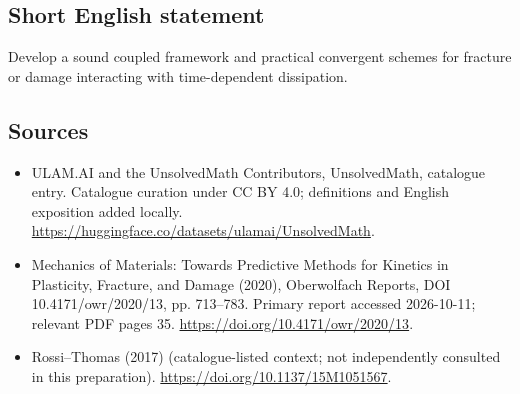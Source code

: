 \documentclass[11pt]{article}
\begin{document}
\subsection{Short English statement}
Develop a sound coupled framework and practical convergent schemes for fracture or damage interacting with time-dependent dissipation.
\subsection{Sources}
\begin{itemize}
\item[\hypertarget{source:statement:1}{S1}] ULAM.AI and the UnsolvedMath Contributors, UnsolvedMath, catalogue entry. Catalogue curation under CC BY 4.0; definitions and English exposition added locally.
\url{https://huggingface.co/datasets/ulamai/UnsolvedMath}.
\item[\hypertarget{source:statement:2}{S2}] Mechanics of Materials: Towards Predictive Methods for Kinetics in Plasticity, Fracture, and Damage (2020), Oberwolfach Reports, DOI 10.4171/owr/2020/13, pp. 713--783. Primary report accessed 2026-10-11; relevant PDF pages 35.
\url{https://doi.org/10.4171/owr/2020/13}.
\item[\hypertarget{source:statement:3}{S3}] Rossi--Thomas (2017) (catalogue-listed context; not independently consulted in this preparation).
\url{https://doi.org/10.1137/15M1051567}.
\end{itemize}
\label{end:statement}
\end{document}
